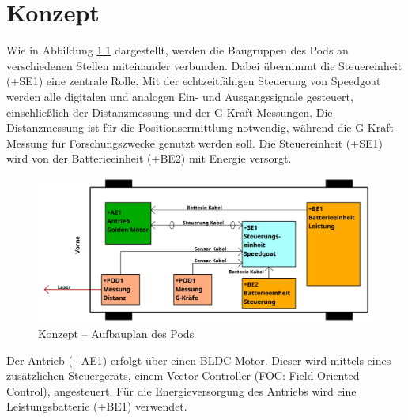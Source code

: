\chapter{Konzept}
\label{chapter:Konzept}

Wie in Abbildung \ref{img_1_1:Konzept:0} dargestellt, werden die Baugruppen des Pods an verschiedenen Stellen miteinander verbunden. Dabei übernimmt die Steuereinheit (+SE1) eine zentrale Rolle. Mit der echtzeitfähigen Steuerung von Speedgoat werden alle digitalen und analogen Ein- und Ausgangssignale gesteuert, einschließlich der Distanzmessung und der G-Kraft-Messungen. Die Distanzmessung ist für die Positionsermittlung notwendig, während die G-Kraft-Messung für Forschungszwecke genutzt werden soll. Die Steuereinheit (+SE1) wird von der Batterieeinheit (+BE2) mit Energie versorgt.

\begin{figure}[!ht]
	\begin{center}
		\includegraphics[width=1\textwidth]{img/3_schaltplan/sp_aufbauplan_0.png}
		\caption{Konzept – Aufbauplan des Pods}
		\label{img_1_1:Konzept:0}
	\end{center}
\end{figure}

Der Antrieb (+AE1) erfolgt über einen BLDC-Motor. Dieser wird mittels eines zusätzlichen Steuergeräts, einem Vector-Controller (FOC: Field Oriented Control), angesteuert. Für die Energieversorgung des Antriebs wird eine Leistungsbatterie (+BE1) verwendet.

